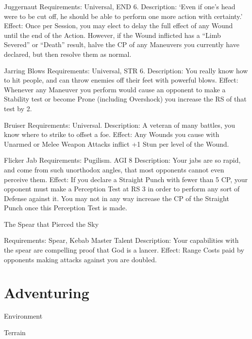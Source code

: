 \documentclass[oneside,11pt,english]{book}
\begin{document}
 

Juggernaut 
Requirements: Universal, END 6. 
Description: ‘Even if one’s head were to be cut off, he should be able to perform one more action with 
certainty.’ 
Effect: Once per Session, you may elect to delay the full effect of any Wound until the end of the Action. 
However, if the Wound inflicted has a “Limb Severed” or “Death” result, halve the CP of any Maneuvers 
you currently have declared, but then resolve them as normal. 

 

Jarring Blows 
Requirements: Universal, STR 6. 
Description: You really know how to hit people, and can throw enemies off their feet with powerful 
blows. 
Effect: Whenever any Maneuver you perform would cause an opponent to make a Stability test or 
become Prone (including Overshock) you increase the RS of that test by 2. 

 

Bruiser 
Requirements: Universal. 
Description: A veteran of many battles, you know where to strike to offset a foe. 
Effect: Any Wounds you cause with Unarmed or Melee Weapon Attacks inflict +1 Stun per level of the 
Wound. 

 

Flicker Jab 
Requirements: Pugilism. AGI 8 
Description: Your jabs are so rapid, and come from such unorthodox angles, that most opponents cannot 
even perceive them. 
Effect: If you declare a Straight Punch with fewer than 5 CP, your opponent must make a Perception Test 
at RS 3 in order to perform any sort of Defense against it. You may not in any way increase the CP of the 
Straight Punch once this Perception Test is made. 

 

The Spear that Pierced the Sky 


Requirements: Spear, Kebab Master Talent 
Description: Your capabilities with the spear are compelling proof that God is a lancer. 
Effect: Range Costs paid by opponents making attacks against you are doubled. 

 

\chapter{Adventuring}\label{ch:adventuring} %
\startcontents[chapters]
\clearpage

Environment

Terrain
\end{document}
